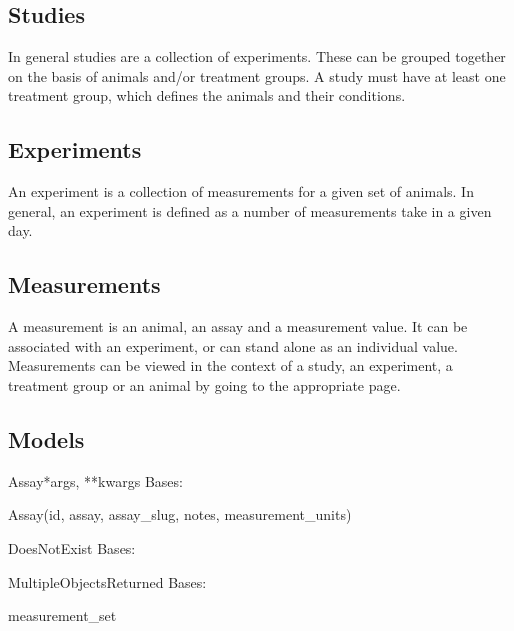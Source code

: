 \documentclass[letterpaper,10pt,english]{sphinxmanual}
\begin{document}
\subsection{Studies}

In general studies are a collection of experiments.  These can be grouped together on the basis of animals and/or treatment groups.  A study must have at least one treatment group, which defines the animals and their conditions.


\subsection{Experiments}

An experiment is a collection of measurements for a given set of animals.  In general, an experiment is defined as a number of measurements take in a given day.


\subsection{Measurements}

A measurement is an animal, an assay and a measurement value.  It can be associated with an experiment, or can stand alone as an individual value.  Measurements can be viewed in the context of a study, an experiment, a treatment group or an animal by going to the appropriate page.


\subsection{Models}
\hypertarget{module-data.models}{}
\modulesynopsis{}

\hypertarget{data.models.Assay}{}\begin{classdesc}{Assay}{*args, **kwargs}
Bases: 

Assay(id, assay, assay\_slug, notes, measurement\_units)

\hypertarget{data.models.Assay.DoesNotExist}{}\begin{excdesc}{DoesNotExist}
Bases: 
\end{excdesc}

\hypertarget{data.models.Assay.MultipleObjectsReturned}{}\begin{excdesc}{MultipleObjectsReturned}
Bases: 
\end{excdesc}

\hypertarget{data.models.Assay.measurement\_set}{}\begin{memberdesc}[Assay]{measurement\_set}\end{memberdesc}
\end{classdesc}
\end{document}
